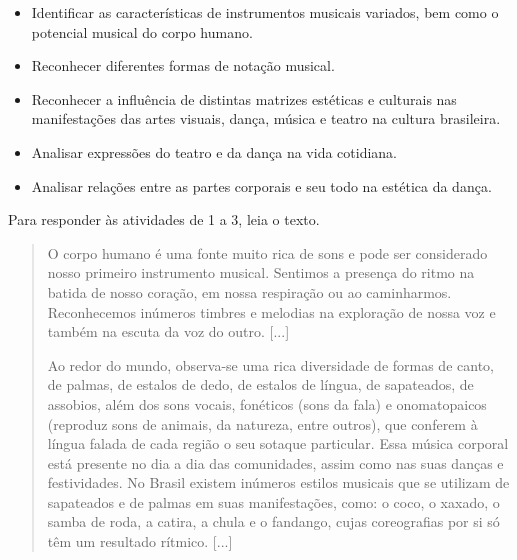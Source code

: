
\begin{itemize}
\item Identificar as características de instrumentos musicais variados, bem
como o potencial musical do corpo humano.

\item Reconhecer diferentes formas de notação musical.

\item Reconhecer a influência de distintas matrizes estéticas e culturais
nas manifestações das artes visuais, dança, música e teatro na cultura
brasileira.

\item Analisar expressões do teatro e da dança na vida cotidiana.

\item Analisar relações entre as partes corporais e seu todo na estética da dança.
\end{itemize}


Para responder às atividades de 1 a 3, leia o texto.

\begin{quote}
O corpo humano é uma fonte muito rica de sons e pode ser considerado
nosso primeiro instrumento musical. Sentimos a presença do ritmo na
batida de nosso coração, em nossa respiração ou ao caminharmos.
Reconhecemos inúmeros timbres e melodias na exploração de nossa voz e
também na escuta da voz do outro. {[}...{]}

Ao redor do mundo, observa-se uma rica diversidade de formas de canto,
de palmas, de estalos de dedo, de estalos de língua, de sapateados, de
assobios, além dos sons vocais, fonéticos (sons da fala) e onomatopaicos
(reproduz sons de animais, da natureza, entre outros), que conferem à
língua falada de cada região o seu sotaque particular. Essa música
corporal está presente no dia a dia das comunidades, assim como nas suas
danças e festividades. No Brasil existem inúmeros estilos musicais que
se utilizam de sapateados e de palmas em suas manifestações, como: o
coco, o xaxado, o samba de roda, a catira, a chula e o fandango, cujas
coreografias por si só têm um resultado rítmico. {[}...{]}

\end{quote}

